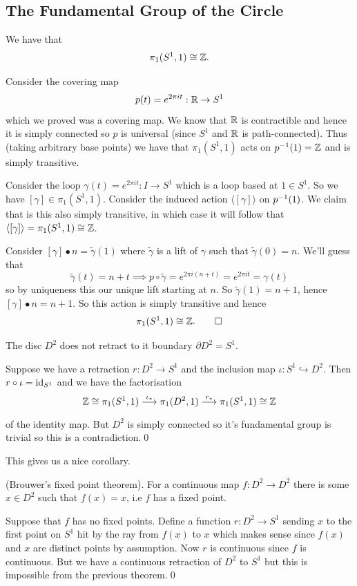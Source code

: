 \documentclass{article}
\begin{document}
\subsection{The Fundamental Group of the Circle}
\begin{theorem}
	We have that
	\[
	  \pi_1(S^1,1) \cong \mathbb{Z}.
	\]
\end{theorem}
\pf
Consider the covering map
\[
	p(t) = e^{2\pi i t}: \mathbb{R} \to S^1
\]
which we proved was a covering map. We know that $ \mathbb{R} $ is contractible and hence it is simply connected so $ p $ is universal (since $ S^1 $ and $ \mathbb{R} $ is path-connected). Thus (taking arbitrary base points) we have that $ \pi_1(S^1,1) $ acts on $ {p}^{-1}(1) = \mathbb{Z} $ and is simply transitive.\par
Consider the loop $ \gamma(t) = e^{2\pi it}:I\to S^1 $ which is a loop based at $ 1\in S^1 $. So we have $ [\gamma]\in \pi_1(S^1,1) $. Consider the induced action $ \langle[\gamma]\rangle $ on $ {p}^{-1}(1) $. We claim that is this also simply transitive, in which case it will follow that $ \langle[\gamma]\rangle = \pi_1(S^1,1) \cong \mathbb{Z} $.\par
Consider $ [\gamma]\bullet n = \tilde \gamma(1) $ where $ \tilde\gamma $ is a lift of $ \gamma $ such that $ \tilde\gamma(0) = n $. We'll guess that 
\[
	\tilde \gamma(t) = n + t\implies p\circ\tilde\gamma = e^{2\pi i(n+t)} = e^{2\pi it} = \gamma(t)
\]
so by uniqueness this our unique lift starting at $ n $. So $ \tilde\gamma(1) = n+1 $, hence $ [\gamma]\bullet n = n+1 $. So this action is simply transitive and hence
\[
  \pi_1(S^1,1) \cong \mathbb{Z}.\qed
\]
\begin{theorem}
  The disc $ D^2 $ does not retract to it boundary $ \partial D^2 = S^1 $.
\end{theorem}
\pf Suppose we have a retraction $ r: D^2 \to S^1 $ and the inclusion map $ \iota: S^1 \hookrightarrow D^2 $. Then $ r\circ \iota = \mathrm{id}_{S^1} $ and we have the factorisation
\[
	\mathbb{Z} \cong \pi_1(S^1,1) \overset{\iota_*}{\underset{}{\longrightarrow}} \pi_1(D^2,1) \overset{r_*}{\underset{}{\longrightarrow}} \pi_1(S^1,1) \cong \mathbb{Z}
\]
of the identity map. But $ D^2 $ is simply connected so it's fundamental group is trivial so this is a contradiction.\qed
\par
This gives us a nice corollary.
\begin{theorem}
	(Brouwer's fixed point theorem). For a continuous map $ f: D^2 \to D^2 $ there is some $ x\in D^2 $ such that $ f(x)=x $, i.e $ f $ has a fixed point.
\end{theorem}
\pf Suppose that $ f $ has no fixed points. Define a function $ r:D^2 \to S^1 $ sending $ x $ to the first point on $ S^1 $ hit by the ray from $ f(x) $ to $ x $ which makes sense since $ f(x) $ and $ x $ are distinct points by assumption. Now $ r $ is continuous since $ f $ is continuous. But we have a continuous retraction of $ D^2 $ to $ S^1 $ but this is impossible from the previous theorem.\qed
\end{document}
